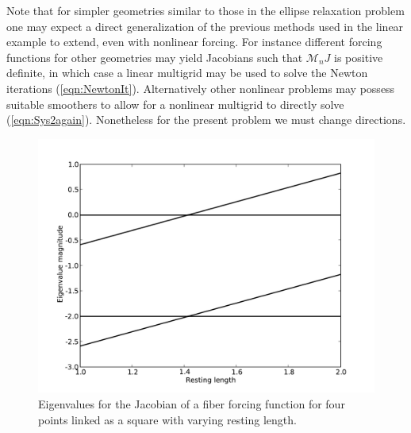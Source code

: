 \documentclass[preprint,12pt]{elsarticle}
\begin{document}
Note that for simpler geometries similar to those in the ellipse relaxation problem one may expect a direct generalization of the previous methods used in the linear example to extend, even with nonlinear forcing. For instance different forcing functions for other geometries may yield Jacobians such that $\mathcal{M}_nJ$ is positive definite, in which case a linear multigrid may be used to solve the Newton iterations (\ref{eqn:NewtonIt}). Alternatively other nonlinear problems may possess suitable smoothers to allow for a nonlinear multigrid to directly solve (\ref{eqn:Sys2again}). Nonetheless for the present problem we must change directions.

\begin{figure}[!b]
  \begin{center}
    \includegraphics[bb=.15in .15in 8in 6in,width=5.25in,clip]{BoxEigenvalues.pdf}
  \end{center}

  \caption{\small Eigenvalues for the Jacobian of a fiber forcing function for four points linked as a square with varying resting length.}
  \label{fig:BoxEigenvalues}
\end{figure}
\end{document}
